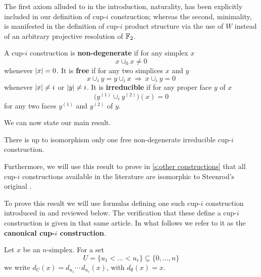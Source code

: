 The first axiom alluded to in the introduction, naturality, has been explicitly included in our definition of cup-$i$ construction; whereas the second, minimality, is manifested in the definition of cup-$i$ product structure via the use of $W$ instead of an arbitrary projective resolution of ${\mathbb{F}_2}$.
\begin{definition}
	A cup-$i$ construction is \textbf{non-degenerate} if for any simplex $x$
	\[
	\boxed{x \cup_0 x \neq 0}
	\]
	whenever $\lvert x\rvert = 0$.
	It is \textbf{free} if for any two simplices $x$ and $y$
	\[
	\boxed{x \cup_{i} y = y \cup_{i} x} \
	\Longrightarrow \
	\boxed{x \cup_{i} y = 0}
	\]
	whenever $\lvert x\rvert \neq i$ or $\lvert y\rvert \neq i$.
	It is \textbf{irreducible} if for any proper face $y$ of $x$
	\[
	\boxed{\Big( y^{(1)} \cup_{i} y^{(2)} \Big)(x) = 0}
	\]
	for any two faces $y^{(1)}$ and $y^{(2)}$ of $y$.
\end{definition}

We can now state our main result.

\begin{theorem} \label{t:main}
	There is up to isomorphism only one free non-degenerate irreducible cup-$i$ construction.
\end{theorem}

Furthermore, we will use this result to prove in \cref{s:other constructions} that all cup-$i$ constructions available in the literature are isomorphic to Steenrod's original \cite{steenrod1947products}.

To prove this result we will use formulas defining one such cup-$i$ construction introduced in \cite{medina2021newformulas} and reviewed below.
The verification that these define a cup-$i$ construction is given in that same article.
In what follows we refer to it as the \textbf{canonical cup-$i$ construction}.

\begin{notation}
	Let $x$ be an $n$-simplex.
	For a set
	\begin{equation*}
	U = \{u_1 < \dots < u_r\} \subseteq \big\{ 0, \dots, n \big\}
	\end{equation*}
	we write $d_U(x) = d_{u_1}\! \dotsm \, d_{u_r}(x)$, with $d_{\emptyset}(x) = x$.
\end{notation}

